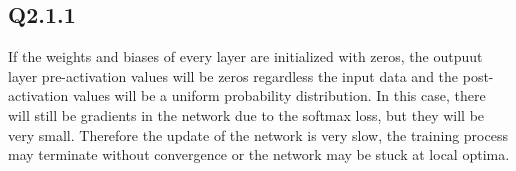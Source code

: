 \documentclass[11pt]{article}
\begin{document}
\newpage

\subsection{Q2.1.1}

If the weights and biases of every layer are initialized with zeros, the outpuut layer pre-activation values will be zeros regardless the input data and the post-activation values will be a uniform probability distribution.
In this case, there will still be gradients in the network due to the softmax loss, but they will be very small. Therefore the update of the network is very slow, the training process may terminate without convergence or the network may be stuck at local optima.





\end{document}
